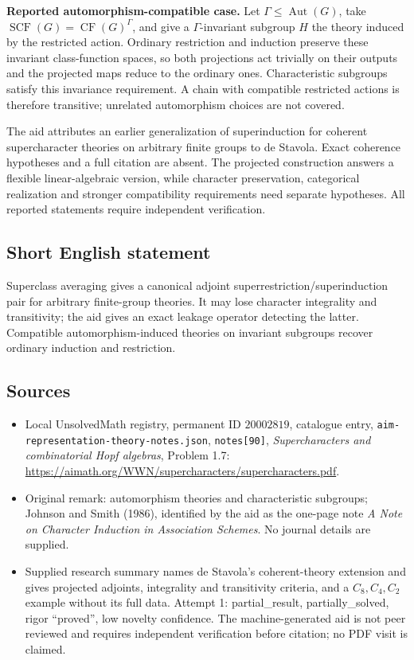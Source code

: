 \documentclass[11pt]{article}
\begin{document}
\textbf{Reported automorphism-compatible case.} Let \(\Gamma\leq\operatorname{Aut}(G)\), take \(\operatorname{SCF}(G)=\operatorname{CF}(G)^\Gamma\), and give a \(\Gamma\)-invariant subgroup \(H\) the theory induced by the restricted action. Ordinary restriction and induction preserve these invariant class-function spaces, so both projections act trivially on their outputs and the projected maps reduce to the ordinary ones. Characteristic subgroups satisfy this invariance requirement. A chain with compatible restricted actions is therefore transitive; unrelated automorphism choices are not covered.

The aid attributes an earlier generalization of superinduction for coherent supercharacter theories on arbitrary finite groups to de Stavola. Exact coherence hypotheses and a full citation are absent. The projected construction answers a flexible linear-algebraic version, while character preservation, categorical realization and stronger compatibility requirements need separate hypotheses. All reported statements require independent verification.
\subsection{Short English statement}
Superclass averaging gives a canonical adjoint superrestriction/superinduction pair for arbitrary finite-group theories. It may lose character integrality and transitivity; the aid gives an exact leakage operator detecting the latter. Compatible automorphism-induced theories on invariant subgroups recover ordinary induction and restriction.
\subsection{Sources}
\begin{itemize}
\item Local UnsolvedMath registry, permanent ID \(20002819\), catalogue entry, \texttt{aim-representation-theory-notes.json}, \texttt{notes[90]}, \emph{Supercharacters and combinatorial Hopf algebras}, Problem 1.7: \url{https://aimath.org/WWN/supercharacters/supercharacters.pdf}.
\item Original remark: automorphism theories and characteristic subgroups; Johnson and Smith (1986), identified by the aid as the one-page note \emph{A Note on Character Induction in Association Schemes}. No journal details are supplied.
\item Supplied research summary names de Stavola's coherent-theory extension and gives projected adjoints, integrality and transitivity criteria, and a \(C_8,C_4,C_2\) example without its full data. Attempt 1: partial\_result, partially\_solved, rigor ``proved'', low novelty confidence. The machine-generated aid is not peer reviewed and requires independent verification before citation; no PDF visit is claimed.
\end{itemize}
\end{document}
